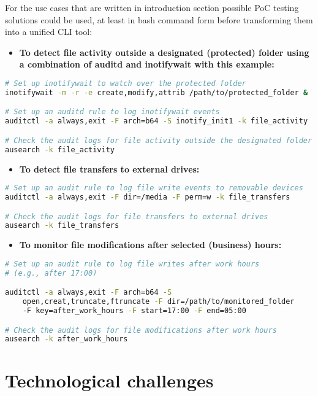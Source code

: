 \documentclass{VUMIFPSmagistrinis}
\begin{document}
For the use cases that are written in introduction section possible PoC testing solutions could be used, at least in bash command form before transforming them into a unified CLI tool:
\begin{itemize}
    \item \textbf{To detect file activity outside a designated (protected) folder using a combination of auditd and inotifywait with this example:}
\end{itemize}
\begin{lstlisting}[language=bash]
# Set up inotifywait to watch over the protected folder
inotifywait -m -r -e create,modify,attrib /path/to/protected_folder &

# Set up an auditd rule to log inotifywait events
auditctl -a always,exit -F arch=b64 -S inotify_init1 -k file_activity

# Check the audit logs for file activity outside the designated folder
ausearch -k file_activity
\end{lstlisting}

\begin{itemize}
    \item \textbf{To detect file transfers to external drives:}
\end{itemize}
\begin{lstlisting}[language=bash]
# Set up an audit rule to log file write events to removable devices
auditctl -a always,exit -F dir=/media -F perm=w -k file_transfers

# Check the audit logs for file transfers to external drives
ausearch -k file_transfers
\end{lstlisting}

\begin{itemize}
    \item \textbf{To monitor file modifications after selected (business) hours:}
\end{itemize}
\begin{lstlisting}[language=bash]
# Set up an audit rule to log file writes after work hours 
# (e.g., after 17:00)

auditctl -a always,exit -F arch=b64 -S 
    open,creat,truncate,ftruncate -F dir=/path/to/monitored_folder 
    -F key=after_work_hours -F start=17:00 -F end=05:00

# Check the audit logs for file modifications after work hours
ausearch -k after_work_hours
\end{lstlisting}

\section{Technological challenges}
\end{document}
